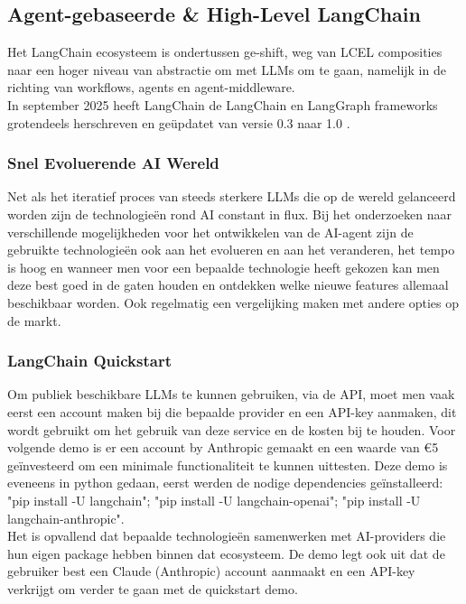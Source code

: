 \subsection{Agent-gebaseerde \& High-Level LangChain}
\label{ssec:agentgebaseerdeandhighlevellangchain}
Het LangChain ecosysteem is ondertussen ge-shift, weg van LCEL composities naar een hoger niveau van abstractie om met LLMs om te gaan, namelijk in de richting van workflows, agents en agent-middleware. \\

In september 2025 heeft LangChain de LangChain en LangGraph frameworks grotendeels herschreven en geüpdatet van versie 0.3 naar 1.0 \autocite{Lim2025}.

\subsubsection{Snel Evoluerende AI Wereld}
\label{sssec:snelevoluerendeaiwereld}
Net als het iteratief proces van steeds sterkere LLMs die op de wereld gelanceerd worden zijn de technologieën rond AI constant in flux. Bij het onderzoeken naar verschillende mogelijkheden voor het ontwikkelen van de AI-agent zijn de gebruikte technologieën ook aan het evolueren en aan het veranderen, het tempo is hoog en wanneer men voor een bepaalde technologie heeft gekozen kan men deze best goed in de gaten houden en ontdekken welke nieuwe features allemaal beschikbaar worden. Ook regelmatig een vergelijking maken met andere opties op de markt.

\subsubsection{LangChain Quickstart}
\label{sssec:langchainquickstart}
Om publiek beschikbare LLMs te kunnen gebruiken, via de API, moet men vaak eerst een account maken bij die bepaalde provider en een API-key aanmaken, dit wordt gebruikt om het gebruik van deze service en de kosten bij te houden. Voor volgende demo is er een account by Anthropic gemaakt en een waarde van €5 geïnvesteerd om een minimale functionaliteit te kunnen uittesten. Deze demo is eveneens in python gedaan, eerst werden de nodige dependencies geïnstalleerd: "pip install -U langchain"; "pip install -U langchain-openai"; "pip install -U langchain-anthropic". \\

Het is opvallend dat bepaalde technologieën samenwerken met AI-providers die hun eigen package hebben binnen dat ecosysteem. De demo legt ook uit dat de gebruiker best een Claude (Anthropic) account aanmaakt en een API-key verkrijgt om verder te gaan met de quickstart demo. \\

